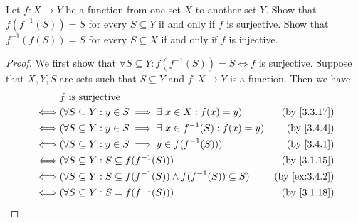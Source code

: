 \begin{ex}\label{ex:3.4.5}
  Let \(f : X \to Y\) be a function from one set \(X\) to another set \(Y\).
  Show that \(f(f^{-1}(S)) = S\) for every \(S \subseteq Y\) if and only if \(f\) is surjective.
  Show that \(f^{-1}(f(S)) = S\) for every \(S \subseteq X\) if and only if \(f\) is injective.
\end{ex}

\begin{proof}
  We first show that \(\forall S \subseteq Y : f(f^{-1}(S)) = S \iff f\) is surjective.
  Suppose that \(X, Y, S\) are sets such that \(S \subseteq Y\) and \(f : X \to Y\) is a function.
  Then we have
  \begin{align*}
         & f \text{ is surjective}                                                                                         \\
    \iff & (\forall S \subseteq Y : y \in S \implies \exists\ x \in X : f(x) = y)            & \text{(by \cref{3.3.17})}   \\
    \iff & (\forall S \subseteq Y : y \in S \implies \exists\ x \in f^{-1}(S) : f(x) = y)    & \text{(by \cref{3.4.4})}    \\
    \iff & (\forall S \subseteq Y : y \in S \implies y \in f(f^{-1}(S)))                     & \text{(by \cref{3.4.1})}    \\
    \iff & (\forall S \subseteq Y : S \subseteq f(f^{-1}(S)))                                & \text{(by \cref{3.1.15})}   \\
    \iff & (\forall S \subseteq Y : S \subseteq f(f^{-1}(S)) \land f(f^{-1}(S)) \subseteq S) & \text{(by \cref{ex:3.4.2})} \\
    \iff & (\forall S \subseteq Y : S = f(f^{-1}(S))).                                       & \text{(by \cref{3.1.18})}
  \end{align*}


\end{proof}
